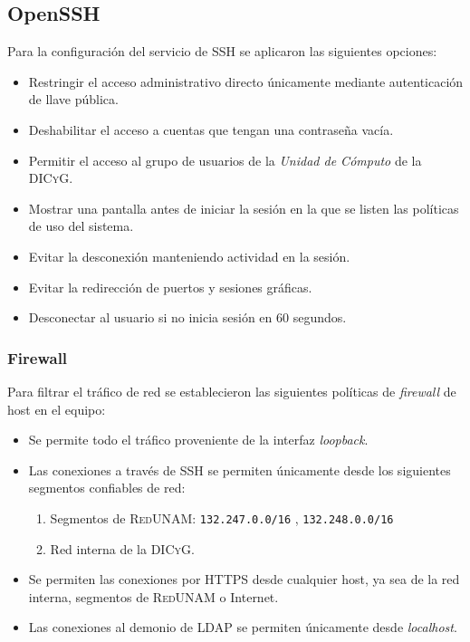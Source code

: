       \subsection {OpenSSH}

Para la configuraci\'{o}n del servicio de \textsc{SSH} se aplicaron las siguientes opciones:

\begin{itemize}
  \item Restringir el acceso administrativo directo \'{u}nicamente mediante autenticaci\'{o}n de llave p\'{u}blica.
  \item Deshabilitar el acceso a cuentas que tengan una contrase\~{n}a vac\'{i}a.
  \item Permitir el acceso al grupo de usuarios de la \textit{Unidad de C\'{o}mputo} de la \textsc{DICyG}.
  \item  Mostrar una pantalla antes de iniciar la sesi\'{o}n en la que se listen las pol\'{i}ticas de uso del sistema.
  \item Evitar la desconexi\'{o}n manteniendo actividad en la sesi\'{o}n.
  \item Evitar la redirecci\'{o}n de puertos y sesiones gr\'{a}ficas.
  \item Desconectar al usuario si no inicia sesi\'{o}n en 60 segundos.
\end{itemize}

        \subsubsection {Firewall}

Para filtrar el tr\'{a}fico de red se establecieron las siguientes pol\'{i}ticas de \textit{firewall} de host en el equipo:

\begin{itemize}
  \item Se permite todo el tr\'{a}fico proveniente de la interfaz \textit{loopback}.
  \item Las conexiones a trav\'{e}s de \textsc{SSH} se permiten \'{u}nicamente desde los siguientes segmentos confiables de red:
  \begin{enumerate}
    \item Segmentos de \textsc{RedUNAM}: \texttt{132.247.0.0/16} , \texttt{132.248.0.0/16}
    \item Red interna de la \textsc{DICyG}.
  \end{enumerate}
  \item Se permiten las conexiones por \textsc{HTTPS} desde cualquier host, ya sea de la red interna, segmentos de \textsc{RedUNAM} o Internet.
  \item Las conexiones al demonio de \textsc{LDAP} se permiten \'{u}nicamente desde \textit{localhost}.
\end{itemize}

